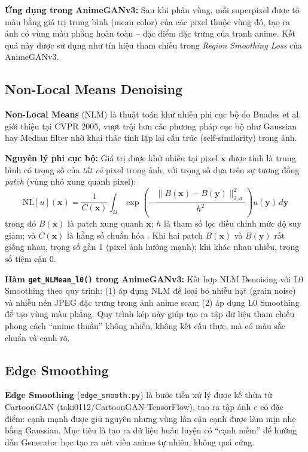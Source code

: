 \textbf{Ứng dụng trong AnimeGANv3:} Sau khi phân vùng, mỗi superpixel được tô màu bằng
giá trị trung bình (mean color) của các pixel thuộc vùng đó, tạo ra ảnh có vùng màu phẳng
hoàn toàn -- đặc điểm đặc trưng của tranh anime. Kết quả này được sử dụng như tín hiệu
tham chiếu trong \textit{Region Smoothing Loss} của AnimeGANv3.

\subsection{Non-Local Means Denoising}
\label{subsec:nlm_denoising}

\textbf{Non-Local Means} (NLM) \cite{Buades2005NLM} là thuật toán khử nhiễu phi cục bộ
do Buades et al. giới thiệu tại CVPR 2005, vượt trội hơn các phương pháp cục bộ như
Gaussian hay Median filter nhờ khai thác tính lặp lại cấu trúc (self-similarity) trong ảnh.

\textbf{Nguyên lý phi cục bộ:} Giá trị được khử nhiễu tại pixel $\mathbf{x}$ được tính
là trung bình có trọng số của \textit{tất cả} pixel trong ảnh, với trọng số dựa trên sự
tương đồng \textit{patch} (vùng nhỏ xung quanh pixel):
\begin{equation}
\label{eq:nlm}
\mathrm{NL}[u](\mathbf{x}) = \frac{1}{C(\mathbf{x})} \int_\Omega \exp\!\left(-\frac{\|B(\mathbf{x}) - B(\mathbf{y})\|^2_{2,a}}{h^2}\right) u(\mathbf{y}) \, d\mathbf{y}
\end{equation}
trong đó $B(\mathbf{x})$ là patch xung quanh $\mathbf{x}$; $h$ là tham số lọc điều chỉnh
mức độ suy giảm; và $C(\mathbf{x})$ là hằng số chuẩn hóa \cite{Buades2005NLM}. Khi hai
patch $B(\mathbf{x})$ và $B(\mathbf{y})$ rất giống nhau, trọng số gần 1 (pixel ảnh hưởng
mạnh); khi khác nhau nhiều, trọng số tiệm cận 0.

\textbf{Hàm \texttt{get\_NLMean\_l0()} trong AnimeGANv3:} Kết hợp NLM Denoising với
L0 Smoothing theo quy trình: (1) áp dụng NLM để loại bỏ nhiễu hạt (grain noise) và
nhiễu nén JPEG đặc trưng trong ảnh anime scan; (2) áp dụng L0 Smoothing để tạo vùng
màu phẳng. Quy trình kép này giúp tạo ra tập dữ liệu tham chiếu phong cách ``anime thuần''
không nhiễu, không kết cấu thực, mà có màu sắc chuẩn và cạnh rõ.

\subsection{Edge Smoothing}
\label{subsec:edge_smoothing}

\textbf{Edge Smoothing} (\texttt{edge\_smooth.py}) là bước tiền xử lý được kế thừa từ
CartoonGAN \cite{Chen2018CartoonGAN} (taki0112/CartoonGAN-TensorFlow), tạo ra tập ảnh
$e$ có đặc điểm: cạnh mạnh được giữ nguyên nhưng vùng lân cận cạnh được làm mịn nhẹ
bằng Gaussian. Mục tiêu là tạo ra dữ liệu huấn luyện có ``cạnh mềm'' để hướng dẫn
Generator học tạo ra nét viền anime tự nhiên, không quá cứng.

